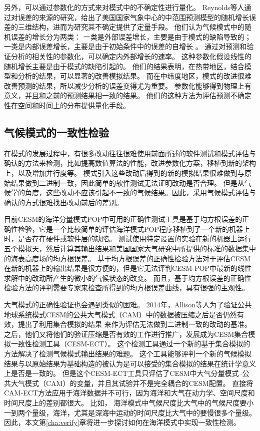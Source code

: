 另外，可以通过参数化的方式来对模式中的不确定性进行量化。
Reynolds等人\cite{reynolds1994random}通过对误差的来源的研究，给出了美国国家气象中心的中范围预测模型的随机增长误差的三维结构，进而为研究其不确定提供了定量手段。
他们认为气候模式中的随机误差的增长分为两类： 一类是外部误差增长，主要是由于模式的缺陷导致的；一类是内部误差增长，主要是由于初始条件中的误差的自增长 。 
通过对预测和验证分析的相关性的参数化，可以确定内外部增长的速率。
这种参数化假设线性的随机增长主要是由于模式的缺陷引起的。 
他们的结果表明，在热带地区，结合模型和分析的结果，可以显著的改善模拟结果。
而在中纬度地区，模式的改进很难改善预测的结果，所以减少分析的误差变得尤为重要。 
参数化能够得到物理上有意义，并且和之前的预测结果相一致的结果。
他们的这种方法为评估预测不确定性在空间和时间上的分布提供量化手段。


\subsection{气候模式的一致性检验}
\label{related:ECT}

在模式的发展过程中，有很多改动往往很难使用前面所述的软件测试和模式评估与确认的方法来检测，比如提高数值算法的性能，改进参数化方案，移植到新的架构上，以及增加并行度等。
模式引入这些改动后得到的新的模拟结果很难做到与原始结果做到二进制一致，因此简单的软件测试无法证明改动是否合理。
但是从气候学的角度，这些改动不应该引起不一致的气候结果。因此，采用气候模式评估与确认的方式很难找出改动前后的差别\cite{yong2015}。


目前CESM的海洋分量模式POP中可用的正确性测试工具是基于均方根误差的正确性检验，它是一个比较简单的评估海洋模式POP程序移植到了一个新的机器上时，是否存在硬件或软件层的缺陷\cite{vertenstein2011cesm1}。 
测试使用特定设置的实验在新的机器上运行五个模拟天，然后计算其输出结果和美国国家大气研究中所提供的标准的数据集中的海表高度场的均方根误差。 
基于均方根误差的正确性检验方法对于评估CESM在新的机器上的输出结果是很方便的，但是它无法评判CESM-POP中最新的线性求解中的改动所产生的微小的气候状态的改变\cite{yong2015}。
而且，基于均方根误差的正确性检验方法的评判需要专家来检查所得到的均方根误差曲线，具有很强的主观性。

大气模式的正确性验证也会遇到类似的困难。
2014年，Allison等人\cite{baker2014methodology}为了验证公共地球系统模式CESM的公共大气模式（CAM）中的数据被压缩之后是否仍然有效，提出了利用集合模拟的结果 来作为评估无法做到二进制一致的改动的基准。
之后，他们又将他们的验证压缩是否有效的工作进行推广，发展成为CESM集合模拟一致性检测工具（CESM-ECT）\cite{baker2015}。
这个检测工具通过一个新的基于集合模拟的方法解决了检测气候模式输出结果的难题。 
这个工具能够评判一个新的气候模拟结果与以原始结果为基础构造的被认为是可以接受的集合模拟的结果在统计学意义上是否是一致的。 
但是这个CESM-ECT工具只评估了CESM中大气分量模式--公共大气模式（CAM）的变量，并且其试验并不是完全耦合的CESM配置。
直接将CAM-ECT方法应用于海洋数据并不可行，因为海洋和大气在动力学、空间尺度和时间尺度上的差别都很大。
比如， 海洋模式中气候尺度比大气中的气候尺度要小一到两个量级，海洋，尤其是深海中运动的时间尺度比大气中的要慢很多个量级。
因此，本文第\ref{cha:verify}章将进一步探讨如何在海洋模式中实现一致性检测。 


